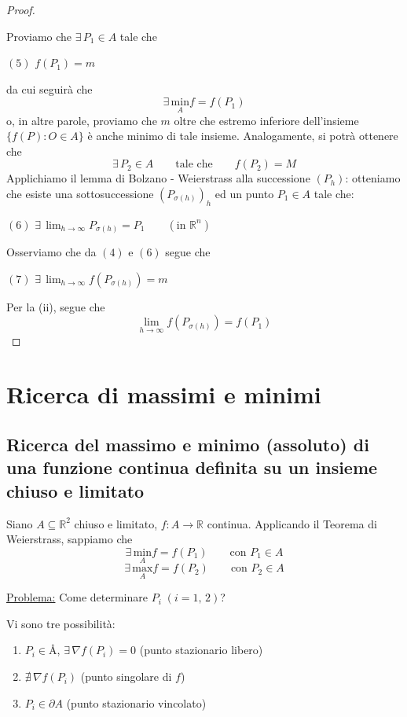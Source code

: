 \begin{proof}
\begin{center}
\end{center}
Proviamo che $\exists \, P_1 \in A$ tale che
\begin{center}
$\mathrm{(5)}$
\hfill
$\displaystyle
f(P_1) = m
$
\hfill \null \\
\end{center}
da cui seguirà che
$$
\exists \, \underset{A}{\mathrm{min}}f = f(P_1)
$$
o, in altre parole, proviamo che $m$ oltre che estremo inferiore dell'insieme $\lbrace f(P) : O \in A \rbrace$ è anche minimo di tale insieme. Analogamente, si potrà ottenere che
$$
\exists \, P_2 \in A \qquad \text{tale che} \qquad f(P_2) = M
$$
Applichiamo il lemma di Bolzano - Weierstrass alla successione $(P_h)$: otteniamo che esiste una sottosuccessione $(P_{\sigma(h)})_h$ ed un punto $P_1 \in A$ tale che:
\begin{center}
$\mathrm{(6)}$
\hfill
$\displaystyle
\exists \, \lim_{h \rightarrow \infty} P_{\sigma(h)} = P_1 \qquad (\text{in } \mathbb{R}^n)
$
\hfill \null \\
\end{center}
Osserviamo che da $\mathrm{(4)}$ e $\mathrm{(6)}$ segue che
\begin{center}
$\mathrm{(7)}$
\hfill
$\displaystyle
\exists \, \lim_{h \rightarrow \infty} f(P_{\sigma(h)}) = m
$
\hfill \null \\
\end{center}
Per la (ii), segue che
$$
\lim_{h \rightarrow \infty} f(P_{\sigma(h)}) = f(P_1)
$$
\end{proof}


\section{Ricerca di massimi e minimi}

\subsection{Ricerca del massimo e minimo (assoluto) di una funzione continua definita su un insieme chiuso e limitato}
Siano $A \subseteq \mathbb{R}^2$ chiuso e limitato, $f : A \longrightarrow \mathbb{R}$ continua. Applicando il Teorema di Weierstrass, sappiamo che
$$
\exists \, \underset{A}{\mathrm{min}}f = f(P_1) \qquad \text{con } P_1 \in A
$$
$$
\exists \, \underset{A}{\mathrm{max}}f = f(P_2) \qquad \text{con } P_2 \in A
$$

\noindent \underline{Problema:} Come determinare $P_i \; (i = 1,\,2)$?

Vi sono tre possibilità:
\begin{enumerate}[labelindent=\parindent,leftmargin=*,label=\textnormal{(\arabic*)},start=1]
\item $P_i \in \text{\AA}$, $\exists \, \nabla f(P_i) = 0$ (punto stazionario libero)
\item $\nexists \, \nabla f(P_i)$ (punto singolare di $f$)
\item $P_i \in \partial A$ (punto stazionario vincolato)
\end{enumerate}

